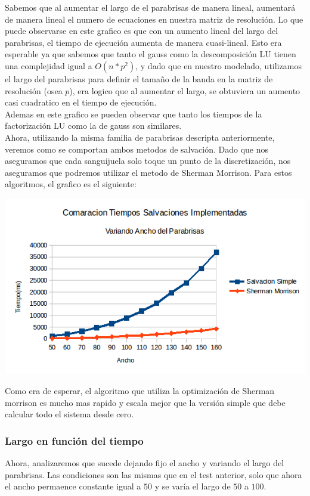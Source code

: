 Sabemos que al aumentar el largo de el parabrisas de manera lineal, aumentará de manera lineal el numero de ecuaciones en nuestra matriz de resolución. Lo que puede observarse en este grafico es que con un aumento lineal del largo del parabrisas, el tiempo de ejecución aumenta de manera cuasi-lineal. Esto era esperable ya que sabemos que tanto el gauss como la descomposición LU tienen una complejidad igual a $O(n*p^2)$, y dado que en nuestro modelado, utilizamos el largo del parabrisas para definir el tamaño de la banda en la matriz de resolución (osea $p$), era logico que al aumentar el largo, se obtuviera un aumento casi cuadratico en el tiempo de ejecución.
\\
Ademas en este grafico se pueden observar que tanto los tiempos de la factorización LU como la de gauss son similares.
\\
Ahora, utilizando la misma familia de parabrisas descripta anteriormente, veremos como se comportan ambos metodos de salvación. Dado que nos aseguramos que cada sanguijuela solo toque un punto de la discretización, nos aseguramos que podremos utilizar el metodo de Sherman Morrison. Para estos algoritmos, el grafico es el siguiente:
\\
\begin{center}
 \includegraphics[width=400pt]{imagenes/testeo/anchoSalv.png}
\end{center}

Como era de esperar, el algoritmo que utiliza la optimización de Sherman morrison es mucho mas rapido y escala mejor que la versión simple que debe calcular todo el sistema desde cero.

\subsubsection{Largo en función del tiempo}
Ahora, analizaremos que sucede dejando fijo el ancho y variando el largo del parabrisas. Las condiciones son las mismas que en el test anterior, solo que ahora el ancho permaence constante igual a $50$ y se varía el largo de $50$ a $100$.

